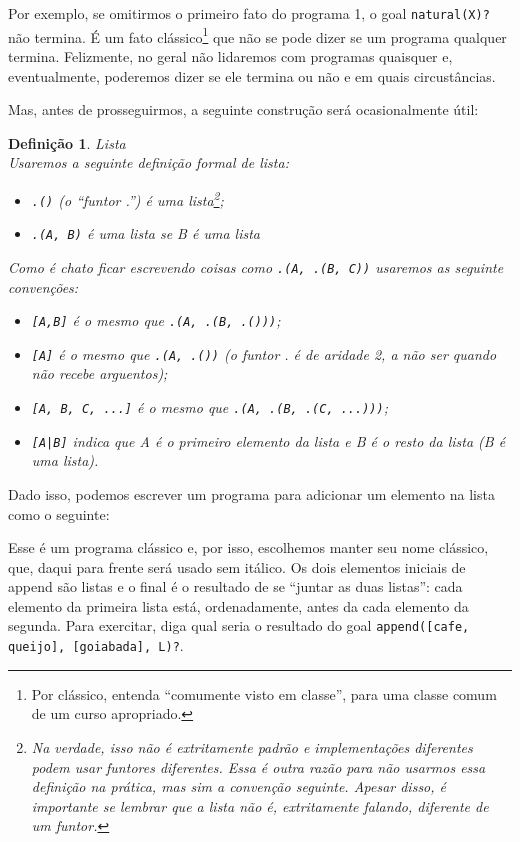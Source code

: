\documentclass{article}
\newtheorem{definition}{Definição}[section]
\theoremstyle{remark}
\begin{document}
Por exemplo, se omitirmos o primeiro fato do programa 1, o goal {\tt natural(X)?} não termina. É um fato clássico\footnote{Por clássico, entenda ``comumente visto em classe'', para uma classe comum de um curso apropriado.} que não se pode dizer se um programa qualquer termina. Felizmente, no geral não lidaremos com programas quaisquer e, eventualmente, poderemos dizer se ele termina ou não e em quais circustâncias.

Mas, antes de prosseguirmos, a seguinte construção será ocasionalmente útil:

\begin{definition}{Lista}
  \\ Usaremos a seguinte definição formal de lista:
  \begin{itemize}
    \item {\tt .()} (o ``funtor .'') é uma lista\footnote{Na verdade, isso não é extritamente padrão e implementações diferentes podem usar funtores diferentes. Essa é outra razão para não usarmos essa definição na prática, mas sim a convenção seguinte. Apesar disso, é importante se lembrar que a lista não é, extritamente falando, diferente de um funtor.};
    \item {\tt .(A, B)} é uma lista se B é uma lista
  \end{itemize}
  Como é chato ficar escrevendo coisas como {\tt.(A, .(B, C))} usaremos as seguinte convenções:
  \begin{itemize}
    \item {\tt [A,B]} é o mesmo que {\tt .(A, .(B, .()))};
    \item {\tt [A]} é o mesmo que {\tt .(A, .())} (o funtor . é de aridade 2, a não ser quando não recebe arguentos);
    \item {\tt [A, B, C, ...]} é o mesmo que {\tt .(A, .(B, .(C, ...)))};
    \item {\tt [A|B]} indica que A é o primeiro elemento da lista e B é o resto da lista (B é uma lista).
  \end{itemize}
\end{definition}

Dado isso, podemos escrever um programa para adicionar um elemento na lista como o seguinte:



Esse é um programa clássico e, por isso, escolhemos manter seu nome clássico, que, daqui para frente será usado sem itálico. Os dois elementos iniciais de append são listas e o final é o resultado de se ``juntar as duas listas'': cada elemento da primeira lista está, ordenadamente, antes da cada elemento da segunda. Para exercitar, diga qual seria o resultado do goal {\tt append([cafe, queijo], [goiabada], L)?}.
\end{document}

